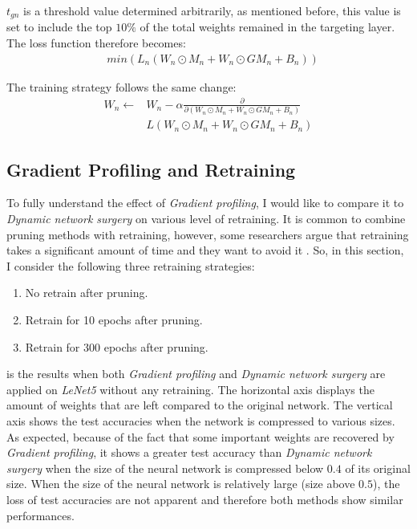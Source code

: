 \documentclass[a4paper,12pt]{report}
\begin{document}
$t_{gn}$ is a threshold value determined arbitrarily, as mentioned before,
this value is set to include the top $10\%$ of the total weights remained in the
targeting layer.
The loss function therefore becomes:
\begin{equation}
  \begin{aligned}
    & min(L_n(W_n \odot M_n + W_n \odot GM_n + B_n))
  \end{aligned}
  \label{equ:minfuncgp}
\end{equation}

The training strategy follows the same change:
\begin{equation}
  \begin{split}
    W_{n} \leftarrow & W_{n} - \alpha \frac{\partial}{\partial(W_n \odot M_n + W_n \odot GM_n + B_n)}  \\
    & L(W_n \odot M_n + W_n \odot GM_n + B_n)
  \end{split}
  \label{equ:trainfuncgp}
\end{equation}



\subsection{Gradient Profiling and Retraining}
To fully understand the effect of \textit{Gradient profiling}, I would like to
compare it to \textit{Dynamic network surgery} on various level of retraining.
It is common to combine pruning methods with retraining, however, some researchers
argue that retraining takes a significant amount of time and they want to
avoid it \cite{molchanov2016pruning}.
So, in this section, I consider the following three retraining strategies:
\begin{enumerate}
  \item No retrain after pruning.
  \item Retrain for 10 epochs after pruning.
  \item Retrain for 300 epochs after pruning.
\end{enumerate}

 is the results when both
\textit{Gradient profiling} and \textit{Dynamic network surgery} are
applied on \textit{LeNet5} without any retraining.
The horizontal axis displays the amount of weights that are left compared to the original
network.
The vertical axis shows the test accuracies when the network is compressed to
various sizes.
As expected, because of the fact that some important weights are recovered by
\textit{Gradient profiling}, it shows a greater test accuracy than \textit{Dynamic network surgery}
when the size of the neural network is compressed below $0.4$ of its original size.
When the size of the neural network is relatively large (size above $0.5$),
the loss of test accuracies are not apparent and therefore both methods show
similar performances.
\end{document}
